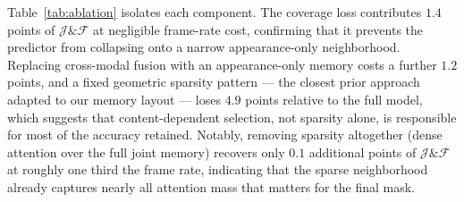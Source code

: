 Table~\ref{tab:ablation} isolates each component. The coverage loss contributes $1.4$ points of $\mathcal{J}\&\mathcal{F}$ at negligible frame-rate cost, confirming that it prevents the predictor from collapsing onto a narrow appearance-only neighborhood. Replacing cross-modal fusion with an appearance-only memory costs a further $1.2$ points, and a fixed geometric sparsity pattern --- the closest prior approach~\cite{park2023sparse} adapted to our memory layout --- loses $4.9$ points relative to the full model, which suggests that content-dependent selection, not sparsity alone, is responsible for most of the accuracy retained. Notably, removing sparsity altogether (dense attention over the full joint memory) recovers only $0.1$ additional points of $\mathcal{J}\&\mathcal{F}$ at roughly one third the frame rate, indicating that the sparse neighborhood already captures nearly all attention mass that matters for the final mask.

